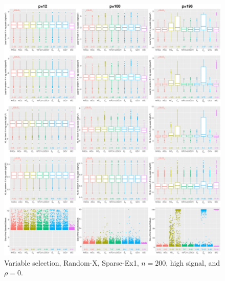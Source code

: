 \begin{figure}[!ht]
\centering
\includegraphics[width=\textwidth]{figures/supplement/randomx/subset_selection/Sparse-Ex1_n200_hsnr_rho0.eps}
\caption{Variable selection, Random-X, Sparse-Ex1, $n=200$, high signal, and $\rho=0$.}
\end{figure}
\clearpage

